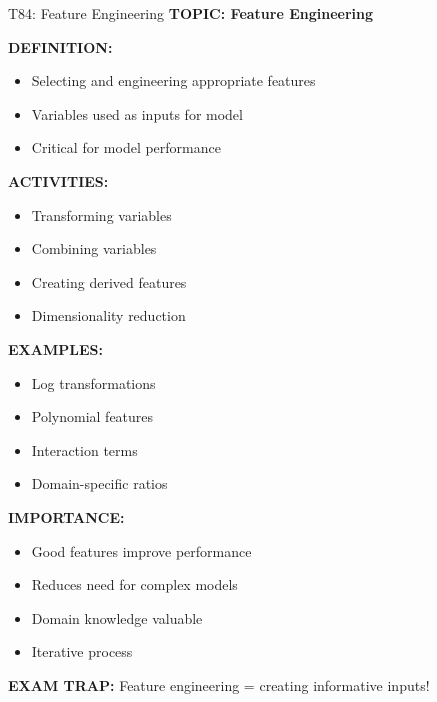 \documentclass[8pt]{beamer}
\begin{document}
	\begin{frame}{T84: Feature Engineering}
		\fontsize{6.5}{7.5}\selectfont
		\textbf{TOPIC: Feature Engineering}
		
		\vspace{0.1cm}
		\textbf{DEFINITION:}
		\begin{itemize}
			\item Selecting and engineering appropriate features
			\item Variables used as inputs for model
			\item Critical for model performance
		\end{itemize}
		
		\vspace{0.1cm}
		\textbf{ACTIVITIES:}
		\begin{itemize}
			\item Transforming variables
			\item Combining variables
			\item Creating derived features
			\item Dimensionality reduction
		\end{itemize}
		
		\vspace{0.1cm}
		\textbf{EXAMPLES:}
		\begin{itemize}
			\item Log transformations
			\item Polynomial features
			\item Interaction terms
			\item Domain-specific ratios
		\end{itemize}
		
		\vspace{0.1cm}
		\textbf{IMPORTANCE:}
		\begin{itemize}
			\item Good features improve performance
			\item Reduces need for complex models
			\item Domain knowledge valuable
			\item Iterative process
		\end{itemize}
		
		\textcolor{myred}{\textbf{EXAM TRAP:}} Feature engineering = \textcolor{myblue}{creating informative inputs}!
	\end{frame}
	
\end{document}

